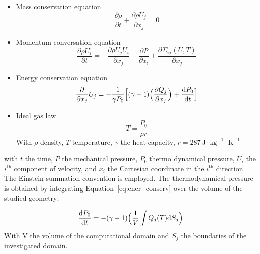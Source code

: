 \begin{itemize}
    \item Mass conservation equation
        \begin{equation}
            \frac{\partial \rho}{\partial t} + \frac{\partial \rho U_j}{\partial x_j} = 0
            \label{eq:mass_conserv}
        \end{equation}
    
    \item Momentum conversation equation
    \begin{equation}
        \frac{
            \partial \rho U_i
        }{
            \partial t
        } = - \frac{
            \partial \rho U_j U_i
        }{
            \partial x_j
        } - \frac{\partial P}{\partial x_i} + \frac{\partial \Sigma_{ij}(U, T)}{\partial x_j}
        \label{eq:moment_conserv}
    \end{equation}
    
    \item Energy conservation equation
    \begin{equation}
        \frac{
            \partial
        }{
            \partial x_j
        } U_j = - \frac{1}{\gamma P_0} \Big[  (\gamma -1) \Big( \frac{\partial Q_j }{\partial x_j} \Big) + \frac{\diff P_0}{\diff t}\Big]
        \label{eq:ener_conserv}
    \end{equation}
    
    \item Ideal gas law
    \begin{equation}
        T = \frac{P_0}{\rho r}
        \label{eq:ideal_gas}
    \end{equation}
    With $\rho$ density, $T$ temperature, $\gamma$ the heat capacity, $r=287 \ \text{J} \cdot \text{kg}^{-1} \cdot \text{K}^{-1}$
\end{itemize}

with $t$ the time, $P$ the mechanical pressure, $P_0$ thermo dynamical pressure, $U_i$ the $i^{\text{th}}$ component of velocity, and $x_i$ the Cartesian coordinate in the $i^{\text{th}}$ direction. The Einstein summation convention is employed. The thermodynamical pressure is obtained by integrating Equation~\ref{eq:ener_conserv} over the volume of the studied geometry:

\begin{equation}
    \difffrac{P_0}{t} = -(\gamma -1) \Big( \frac{1}{V} \int Q_j({T}) \diff S_j \Big)
\end{equation}
With V the volume of the computational domain and $S_j$ the boundaries of the investigated domain.

